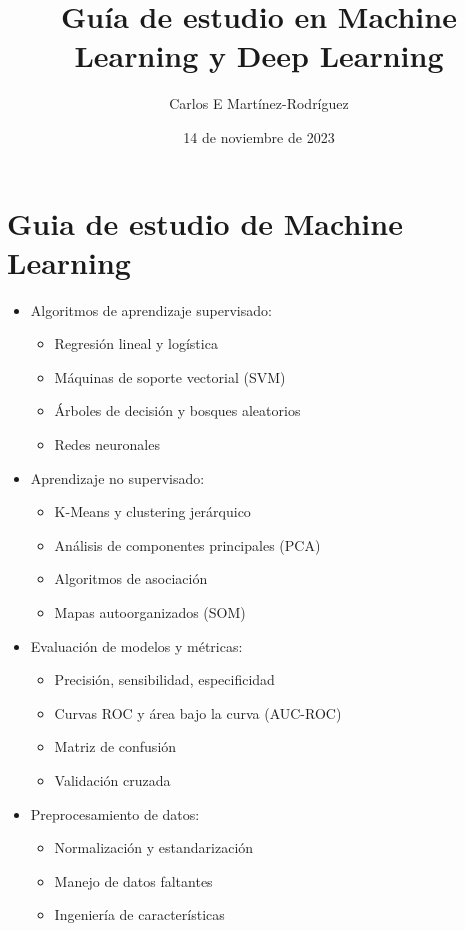 \documentclass{article}
\title{Gu\'ia de estudio en Machine Learning y  Deep Learning}
\author{Carlos E Mart\'inez-Rodr\'iguez}
\date{14  de noviembre de 2023}  %
\begin{document}
\maketitle
\tableofcontents

\section{Guia de estudio de Machine Learning}

\begin{itemize}
    \item Algoritmos de aprendizaje supervisado:
        \begin{itemize}
            \item Regresión lineal y logística
            \item Máquinas de soporte vectorial (SVM)
            \item Árboles de decisión y bosques aleatorios
            \item Redes neuronales
        \end{itemize}
    \item Aprendizaje no supervisado:
        \begin{itemize}
            \item K-Means y clustering jerárquico
            \item Análisis de componentes principales (PCA)
            \item Algoritmos de asociación
            \item Mapas autoorganizados (SOM)
        \end{itemize}
    \item Evaluación de modelos y métricas:
        \begin{itemize}
            \item Precisión, sensibilidad, especificidad
            \item Curvas ROC y área bajo la curva (AUC-ROC)
            \item Matriz de confusión
            \item Validación cruzada
        \end{itemize}
    \item Preprocesamiento de datos:
        \begin{itemize}
            \item Normalización y estandarización
            \item Manejo de datos faltantes
            \item Ingeniería de características

\end{itemize}
\end{itemize}
\end{document}
